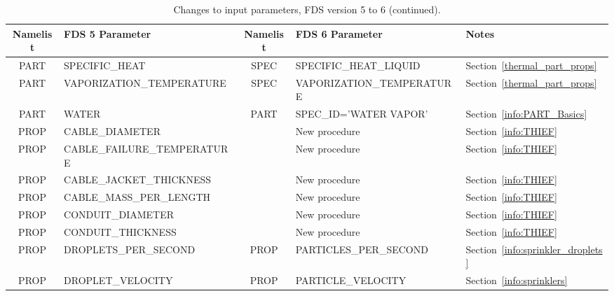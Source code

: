 \documentclass[11pt]{book}
\begin{document}
\begin{table}
\caption[List of changes to input parameters for FDS 6 (continued)]{Changes to input parameters, FDS version 5 to 6 (continued).}
\label{tbl:Changes2}
\centering
\begin{tabular}{@{\extracolsep{\fill}}|c|l|c|l|l|}
\hline
Namelist      & FDS 5 Parameter                     & Namelist     & FDS 6 Parameter & Notes \\ \hline \hline
{\ct PART}    & {\ct SPECIFIC\_HEAT}                &  {\ct SPEC}  & {\ct SPECIFIC\_HEAT\_LIQUID}                & Section~\ref{thermal_part_props}         \\ \hline
{\ct PART}    & {\ct VAPORIZATION\_TEMPERATURE}     &  {\ct SPEC}  & {\ct VAPORIZATION\_TEMPERATURE}             & Section~\ref{thermal_part_props}         \\ \hline
{\ct PART}    & {\ct WATER}                         &  {\ct PART}  &  {\ct SPEC\_ID='WATER VAPOR'}               & Section~\ref{info:PART_Basics}               \\ \hline
{\ct PROP}    & {\ct CABLE\_DIAMETER}               &              & New procedure                               & Section~\ref{info:THIEF}      \\ \hline
{\ct PROP}    & {\ct CABLE\_FAILURE\_TEMPERATURE}   &              & New procedure                               & Section~\ref{info:THIEF}      \\ \hline
{\ct PROP}    & {\ct CABLE\_JACKET\_THICKNESS}      &              & New procedure                               & Section~\ref{info:THIEF}      \\ \hline
{\ct PROP}    & {\ct CABLE\_MASS\_PER\_LENGTH}      &              & New procedure                               & Section~\ref{info:THIEF}      \\ \hline
{\ct PROP}    & {\ct CONDUIT\_DIAMETER}             &              & New procedure                               & Section~\ref{info:THIEF}      \\ \hline
{\ct PROP}    & {\ct CONDUIT\_THICKNESS}            &              & New procedure                               & Section~\ref{info:THIEF}      \\ \hline
{\ct PROP}    & {\ct DROPLETS\_PER\_SECOND}         &  {\ct PROP}  &  {\ct PARTICLES\_PER\_SECOND}               & Section~\ref{info:sprinkler_droplets} \\ \hline
{\ct PROP}    & {\ct DROPLET\_VELOCITY}             &  {\ct PROP}  &  {\ct PARTICLE\_VELOCITY}                   & Section~\ref{info:sprinklers} \\ \hline

\end{tabular}
\end{table}
\end{document}
